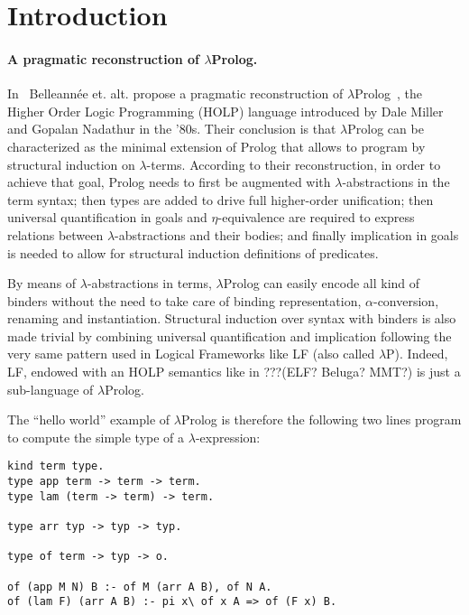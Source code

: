 \documentclass{easychair}
\begin{document}
\section{Introduction}

\paragraph{A pragmatic reconstruction of $\lambda$Prolog.}

In~\cite{jlp98} Belleannée et. alt. propose a pragmatic reconstruction
of $\lambda$Prolog~\cite{lambdap1,lambdap2,lambdap3}, the Higher Order
Logic Programming (HOLP) language introduced by Dale Miller and
Gopalan Nadathur in the '80s.
Their conclusion is that $\lambda$Prolog can be characterized as the
minimal extension of Prolog that allows to program by structural
induction on $\lambda$-terms. According to their reconstruction, in
order to achieve that goal, Prolog needs to first be augmented with
$\lambda$-abstractions in the term syntax; then types are added to
drive full higher-order unification; then universal quantification in
goals and $\eta$-equivalence are required to express relations between
$\lambda$-abstractions and their bodies; and finally implication in
goals is needed to allow for structural induction definitions of
predicates.

By means of $\lambda$-abstractions in terms, $\lambda$Prolog can
easily encode all kind of binders without the need to take care of
binding representation, $\alpha$-conversion, renaming and
instantiation. Structural induction over syntax with binders is also
made trivial by combining universal quantification and implication
following the very same pattern used in Logical Frameworks like LF
(also called $\lambda$P). Indeed, LF, endowed with an HOLP semantics
like in ???(ELF? Beluga? MMT?) is just a sub-language of
$\lambda$Prolog.

The ``hello world'' example of $\lambda$Prolog is therefore the
following two lines program to compute the simple type of a
$\lambda$-expression:

\begin{verbatim}
kind term type.
type app term -> term -> term.
type lam (term -> term) -> term.

type arr typ -> typ -> typ.

type of term -> typ -> o.

of (app M N) B :- of M (arr A B), of N A.
of (lam F) (arr A B) :- pi x\ of x A => of (F x) B.
\end{verbatim}
\end{document}
